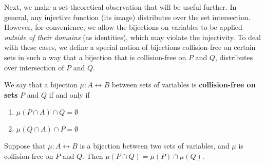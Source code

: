 Next, we make a set-theoretical observation
that will be useful further.
In general, any injective function (its image)
distributes over the set intersection.
However, for convenience, we allow the bijections
on variables to be applied
\emph{outside of their domains}
(as identities), which may violate
the injectivity. To deal with these cases, 
we define a special notion of
bijections collision-free on certain sets
in such a way that
a bijection that is collision-free on $P$ and $Q$,
distributes over intersection of $P$ and $Q$.

\begin{definition} 
  We say that a bijection $\mu : A \leftrightarrow B$ between sets of
  variables is \textbf{collision-free on sets} $P$ and $Q$ if and only if
  \begin{enumerate}
    \item $\mu(P \cap A) \cap Q = \emptyset$
    \item $\mu(Q \cap A) \cap P = \emptyset$
  \end{enumerate}
\end{definition}

\begin{observation}
  Suppose that $\mu : A \leftrightarrow B$ is a bijection between two sets of variables,
  and $\mu$ is collision-free on $P$ and $Q$.
  Then $\mu(P \cap Q) = \mu(P) \cap \mu(Q)$.
\end{observation}
  
